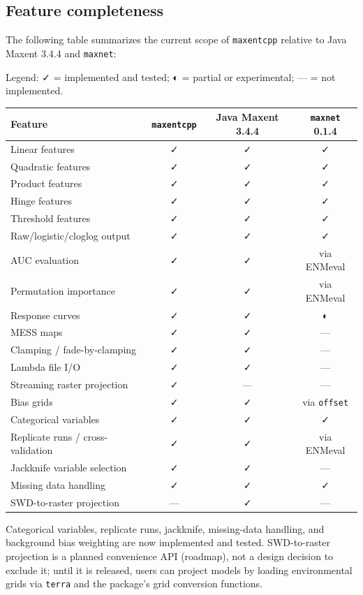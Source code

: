 \documentclass[10pt,letterpaper]{article}
\begin{document}
\subsection*{Feature completeness}

The following table summarizes the current scope of \texttt{maxentcpp}
relative to Java Maxent 3.4.4 and \texttt{maxnet}:

Legend: ✓ = implemented and tested; ◐ = partial or experimental; --- =
not implemented.

\begin{longtable}[]{@{}lccc@{}}
\toprule\noalign{}
Feature & \texttt{maxentcpp} & Java Maxent 3.4.4 & \texttt{maxnet}
0.1.4 \\
\midrule\noalign{}
\endhead
\bottomrule\noalign{}
\endlastfoot
Linear features & ✓ & ✓ & ✓ \\
Quadratic features & ✓ & ✓ & ✓ \\
Product features & ✓ & ✓ & ✓ \\
Hinge features & ✓ & ✓ & ✓ \\
Threshold features & ✓ & ✓ & ✓ \\
Raw/logistic/cloglog output & ✓ & ✓ & ✓ \\
AUC evaluation & ✓ & ✓ & via ENMeval \\
Permutation importance & ✓ & ✓ & via ENMeval \\
Response curves & ✓ & ✓ & ◐ \\
MESS maps & ✓ & ✓ & --- \\
Clamping / fade-by-clamping \cite{Phillips2008} & ✓ & ✓ & --- \\
Lambda file I/O & ✓ & ✓ & --- \\
Streaming raster projection & ✓ & --- & --- \\
Bias grids & ✓ & ✓ & via \texttt{offset} \\
Categorical variables & ✓ & ✓ & ✓ \\
Replicate runs / cross-validation & ✓ & ✓ & via ENMeval \\
Jackknife variable selection & ✓ & ✓ & --- \\
Missing data handling & ✓ & ✓ & ✓ \\
SWD-to-raster projection & --- & ✓ & --- \\
\end{longtable}

Categorical variables, replicate runs, jackknife, missing-data handling,
and background bias weighting are now implemented and tested.
SWD-to-raster projection is a planned convenience API (roadmap), not a
design decision to exclude it; until it is released, users can project
models by loading environmental grids via \texttt{terra} and the
package's grid conversion functions.
\end{document}
